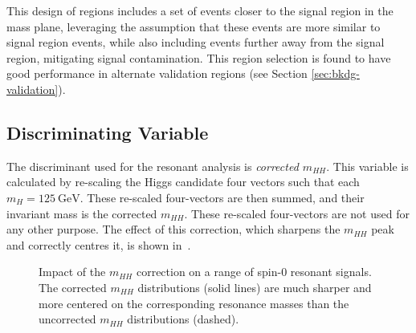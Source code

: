 This design of regions includes a set of events closer to the signal region in the mass plane, leveraging
the assumption that these events are more similar to signal region events, while also including events further away
from the signal region, mitigating signal contamination. This region selection is found to have good performance
in alternate validation regions (see Section \ref{sec:bkdg-validation}).

\subsection{Discriminating Variable}
\label{subsec:disc-var}

The discriminant used for the resonant analysis is \emph{corrected $m_{HH}$}. This
variable is calculated by re-scaling the Higgs candidate four vectors such that
each $m_{H} = \SI{125}{\GeV}$. These re-scaled four-vectors are then summed, and
their invariant mass is the corrected $m_{HH}$. These re-scaled four-vectors are
not used for any other purpose. The effect of this correction, which sharpens
the $m_{HH}$ peak and correctly centres it, is shown
in~\Fig{\ref{fig:m-hh-cor-effect}}.
\begin{figure}[ht]
\centering
{}
\caption{\label{fig:m-hh-cor-effect} Impact of the $m_{HH}$ correction on a range of spin-0 
resonant signals. The corrected $m_{HH}$ distributions (solid lines) are much sharper and 
more centered on the corresponding resonance masses than the uncorrected $m_{HH}$ distributions 
(dashed).}
\end{figure}

